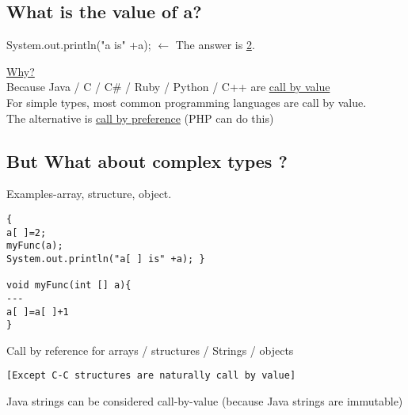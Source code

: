 \documentclass{article}
\begin{document}
\subsection*{What is the value of a?}
\begin{flushleft}
System.out.println("a is" +a); $\leftarrow$ The answer is \underline{2}.
\end{flushleft}

\doublespacing
\begin{flushleft}
\underline{Why?}\\
Because Java / C / C\# / Ruby / Python / C++ are \underline{call by value}\\
For simple types, most common programming languages are call by value.\\
The alternative is \underline{call by preference} (PHP can do this)
\end{flushleft}

\subsection*{But What about complex types ?}
\begin{flushleft}
Examples-array, structure, object.
\begin{verbatim}
{ 
a[ ]=2;
myFunc(a);
System.out.println("a[ ] is" +a); }

void myFunc(int [] a){
---
a[ ]=a[ ]+1
}
\end{verbatim}
\end{flushleft}

\doublespacing
\begin{flushleft}
Call by reference for arrays / structures / Strings / objects 
\begin{verbatim}
[Except C-C structures are naturally call by value]
\end{verbatim}
\begin{flushleft}
Java strings can be considered call-by-value (because Java strings are immutable)
\end{flushleft}
\end{flushleft}
\end{document}
